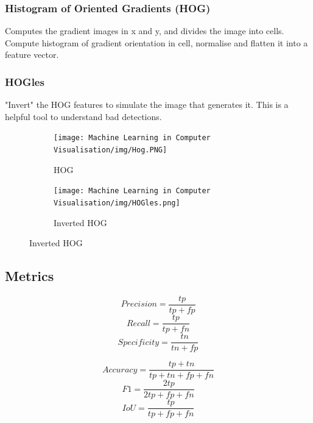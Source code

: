 \documentclass[x11names,11pt,a4paper]{article}
\theoremstyle{definition}
\begin{document}
\subsubsection{Histogram of Oriented Gradients (HOG)}
Computes the gradient images in x and y, and divides the image into cells. Compute histogram of gradient orientation in cell, normalise and flatten it into a feature vector.

\subsubsection{HOGles}
"Invert" the HOG features to simulate the image that generates it. This is a helpful tool to understand bad detections.

\begin{figure}[H]
     \centering
     \begin{subfigure}[b]{0.45\textwidth}
         \centering
         \texttt{[image: Machine Learning in Computer Visualisation/img/Hog.PNG]}
         \caption{HOG}
     \end{subfigure}
     \hfill
     \begin{subfigure}[b]{0.45\textwidth}
         \centering
         \texttt{[image: Machine Learning in Computer Visualisation/img/HOGles.png]}
         \caption{Inverted HOG}
     \end{subfigure}
\end{figure}

\subsection{Metrics}
\begin{figure}[H]
     \centering
     \begin{subfigure}[b]{0.45\textwidth}
         \centering
         \begin{equation}
    Precision = \frac{tp}{tp+fp}
\end{equation}
\begin{equation}
    Recall = \frac{tp}{tp+fn}
\end{equation}
\begin{equation}
    Specificity = \frac{tn}{tn+fp}
\end{equation}
     \end{subfigure}
     \hfill
     \begin{subfigure}[b]{0.45\textwidth}
     \centering
    \begin{equation}
    Accuracy = \frac{tp+tn}{tp+tn+fp+fn}
\end{equation}
    \begin{equation}
    F1 = \frac{2tp}{2tp+fp+fn}
\end{equation}
    \begin{equation}
    IoU = \frac{tp}{tp+fp+fn}
\end{equation}
     \end{subfigure}
\end{figure}
\end{document}
